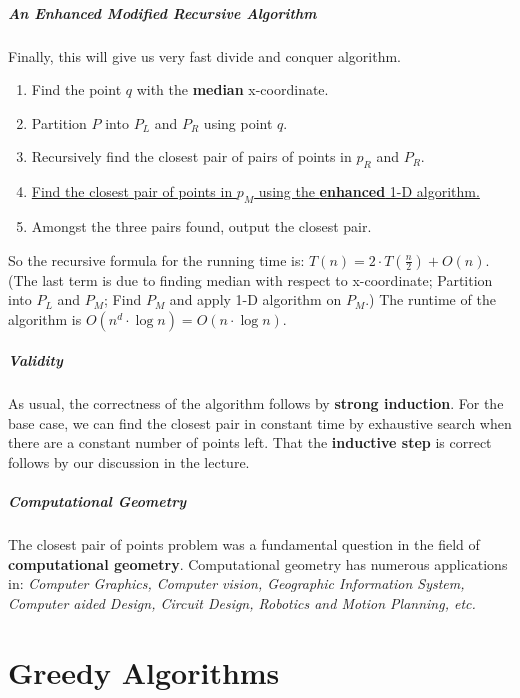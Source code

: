 \documentclass[11pt, a4paper, oneside]{book}
\theoremstyle{theoremdd}
\theoremstyle{remark}
\begin{document}
\subsubsection{An Enhanced Modified Recursive Algorithm}
Finally, this will give us very fast divide and conquer algorithm. 
\begin{enumerate}
\item Find the point $q$ with the \textbf{median} x-coordinate.
\item Partition $P$ into $P_{L}$ and $P_{R}$ using point $q$.
\item Recursively find the closest pair of pairs of points in $p_{R}$ and $P_{R}$.
\item \underline{Find the closest pair of points in $p_{M}$ using the \textbf{enhanced} 1-D algorithm.}
\item Amongst the three pairs found, output the closest pair. 
\end{enumerate}
So the recursive formula for the running time is: $T(n) = 2\cdot T(\frac{n}{2}) + O(n)$. (The last term is due to finding median with respect to x-coordinate; Partition into $P_{L}$ and $P_{M}$; Find $P_{M}$ and apply 1-D algorithm on $P_{M}$.) The runtime of the algorithm is $O(n^{d}\cdot \log n) = O(n\cdot \log n)$.

\subsubsection*{Validity}
As usual, the correctness of the algorithm follows by \textbf{strong induction}. For the base case, we can find the closest pair in constant time by exhaustive search when there are a constant number of points left. That the \textbf{inductive step} is correct follows by our discussion in the lecture. 

\subsubsection*{Computational Geometry}
The closest pair of points problem was a fundamental question in the field of \textbf{computational geometry}. Computational geometry has numerous applications in: \textit{Computer Graphics, Computer vision, Geographic Information System, Computer aided Design, Circuit Design, Robotics and Motion Planning, etc.}

\part{Greedy Algorithms}
\end{document}
